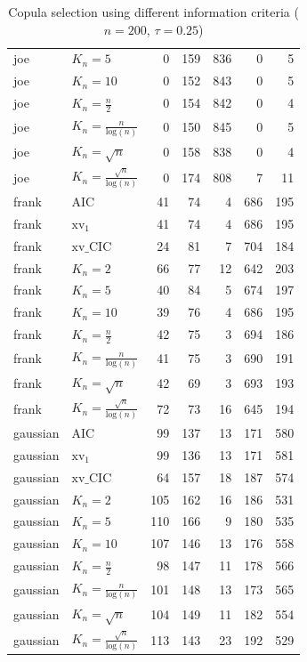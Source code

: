 \begin{table}[htbp]
\begin{tabular}{llrrrrr}
  joe & $K_{n}=5$ & 0 & 159 & 836 & 0 & 5 \\ 
  joe & $K_{n}=10$ & 0 & 152 & 843 & 0 & 5 \\ 
  joe & $K_{n}=\tfrac{n}{2}$ & 0 & 154 & 842 & 0 & 4 \\ 
  joe & $K_{n}=\tfrac{n}{\text{log}(n)}$ & 0 & 150 & 845 & 0 & 5 \\ 
  joe & $K_{n}=\sqrt{n}$ & 0 & 158 & 838 & 0 & 4 \\ 
  joe & $K_{n}=\tfrac{\sqrt{n}}{\text{log}(n)}$ & 0 & 174 & 808 & 7 & 11 \\ 
   \hdashline
frank & AIC & 41 & 74 & 4 & 686 & 195 \\ 
  frank & $\text{xv}_{1}$ & 41 & 74 & 4 & 686 & 195 \\ 
  frank & $\text{xv}\_\text{CIC}$ & 24 & 81 & 7 & 704 & 184 \\ 
  frank & $K_{n}=2$ & 66 & 77 & 12 & 642 & 203 \\ 
  frank & $K_{n}=5$ & 40 & 84 & 5 & 674 & 197 \\ 
  frank & $K_{n}=10$ & 39 & 76 & 4 & 686 & 195 \\ 
  frank & $K_{n}=\tfrac{n}{2}$ & 42 & 75 & 3 & 694 & 186 \\ 
  frank & $K_{n}=\tfrac{n}{\text{log}(n)}$ & 41 & 75 & 3 & 690 & 191 \\ 
  frank & $K_{n}=\sqrt{n}$ & 42 & 69 & 3 & 693 & 193 \\ 
  frank & $K_{n}=\tfrac{\sqrt{n}}{\text{log}(n)}$ & 72 & 73 & 16 & 645 & 194 \\ 
   \hdashline
gaussian & AIC & 99 & 137 & 13 & 171 & 580 \\ 
  gaussian & $\text{xv}_{1}$ & 99 & 136 & 13 & 171 & 581 \\ 
  gaussian & $\text{xv}\_\text{CIC}$ & 64 & 157 & 18 & 187 & 574 \\ 
  gaussian & $K_{n}=2$ & 105 & 162 & 16 & 186 & 531 \\ 
  gaussian & $K_{n}=5$ & 110 & 166 & 9 & 180 & 535 \\ 
  gaussian & $K_{n}=10$ & 107 & 146 & 13 & 176 & 558 \\ 
  gaussian & $K_{n}=\tfrac{n}{2}$ & 98 & 147 & 11 & 178 & 566 \\ 
  gaussian & $K_{n}=\tfrac{n}{\text{log}(n)}$ & 101 & 148 & 13 & 173 & 565 \\ 
  gaussian & $K_{n}=\sqrt{n}$ & 104 & 149 & 11 & 182 & 554 \\ 
  gaussian & $K_{n}=\tfrac{\sqrt{n}}{\text{log}(n)}$ & 113 & 143 & 23 & 192 & 529 \\ 
   \hline
\end{tabular}
\caption{Copula selection using different information criteria ($n = 200$, $\tau = 0.25$)} 
\end{table}


